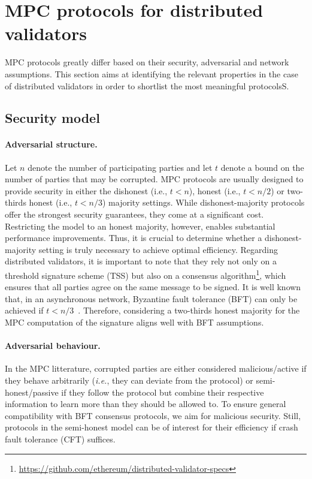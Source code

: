 \section{MPC protocols for distributed validators}
MPC protocols greatly differ based on their security, adversarial and network assumptions. This section aims at identifying the relevant properties in the case of distributed validators in order to shortlist the most meaningful protocolsS.
\subsection{Security model}
\paragraph{Adversarial structure.}
Let $n$ denote the number of participating parties and let $t$ denote a bound on the number of parties that may be corrupted.
MPC protocols are usually designed to provide security in either the dishonest (i.e., $t < n$), honest (i.e., $t < n/2$) or two-thirds honest (i.e., $t < n/3$) majority settings.
While dishonest-majority protocols offer the strongest security guarantees, they come at a significant cost.
Restricting the model to an honest majority, however, enables substantial performance improvements.
Thus, it is crucial to determine whether a dishonest-majority setting is truly necessary to achieve optimal efficiency.
Regarding distributed validators, it is important to note that they rely not only on a threshold signature scheme (TSS) but also on a consensus algorithm\footnote{\url{https://github.com/ethereum/distributed-validator-specs}}, which ensures that all parties agree on the same message to be  signed.
It is well known that, in an asynchronous network, Byzantine fault tolerance (BFT) can only be achieved if $t < n/3$~\cite{10.1145/322186.322188}.
Therefore, considering a two-thirds honest majority for the MPC computation of the signature aligns well with BFT assumptions.
 
\paragraph{Adversarial behaviour.}
In the MPC litterature, corrupted parties are either considered malicious/active if they behave arbitrarily (\textit{i.e.}, they can deviate from the protocol) or semi-honest/passive if they follow the protocol but combine their respective information to learn more than they should be allowed to.
To ensure general compatibility with BFT consensus protocols, we aim for malicious security.
Still, protocols in the semi-honest model can be of interest for their efficiency if crash fault tolerance (CFT) suffices.

